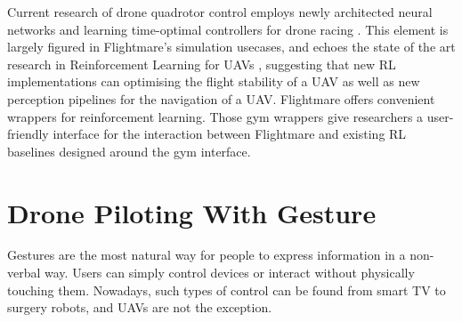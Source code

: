 Current research of drone quadrotor control employs newly architected neural networks and learning time-optimal controllers for drone racing \cite{drl_review}. This element is largely figured in Flightmare's \cite{flightmare} simulation usecases, and echoes the state of the art research in Reinforcement Learning for UAVs \cite{drl_review}, suggesting that new RL implementations can optimising the flight stability of a UAV as well as new perception pipelines for the navigation of a UAV. Flightmare offers convenient wrappers for reinforcement learning. Those gym wrappers give researchers a user-friendly interface for the interaction between Flightmare and existing RL baselines designed around the gym interface.





    






\pagebreak
\section{Drone Piloting With Gesture}\label{section:gesture_piloting}

Gestures are the most natural way for people to express information in a non-verbal way. Users can simply control devices or interact without physically touching them. Nowadays, such types of control can be found from smart TV to surgery robots, and UAVs are not the exception.

